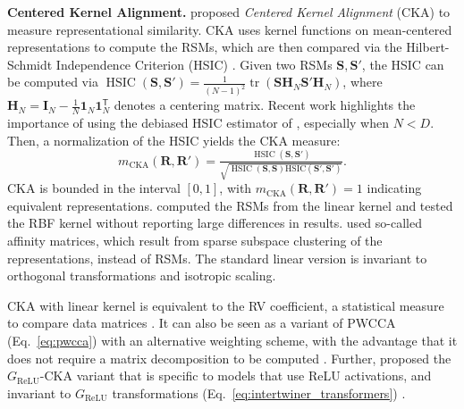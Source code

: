 \documentclass{article}
\newcommand{\citet}{\textcite}
\newcommand{\R}{\bm{R}}
\newcommand{\Rp}{\bm{R'}}
\newcommand{\Sm}{\bm{S}}
\newcommand{\Smp}{\bm{S'}}
\newcommand{\transp}{\mathsf{T}}
\newcommand\myeqref[1]{%
    (\textup{Eq.~\ref{#1}})%
}
\newcommand{\subheader}{\textbf}
\begin{document}
\subheader{Centered Kernel Alignment.}\label{sssec:cka}
\citet{kornblith_similarity_2019} proposed \emph{Centered Kernel Alignment} (CKA) \cite{cortes_algorithms_2012, cristianini_kernel-target_2001} to measure representational similarity.
CKA uses kernel functions on mean-centered representations to compute the RSMs, which are then compared via the Hilbert-Schmidt Independence Criterion (HSIC) \cite{gretton_measuring_2005}.
Given two RSMs $\Sm, \Smp$, the HSIC can be computed via $\operatorname{HSIC}(\Sm, \Smp) = \tfrac{1}{(N-1)^2} \operatorname{tr}(\Sm\bm{H}_N\Smp\bm{H}_N)$, where $\bm{H}_N = \bm{I}_N - \tfrac{1}{N} \bm{1}_N\bm{1}_N^\transp$ denotes a centering matrix. %
Recent work \cite{murphy_correcting_2024} highlights the importance of using the debiased HSIC estimator of \citet{song_feature_2012}, especially when $N<D$.
Then, a normalization of the HSIC yields the CKA measure:
\begin{equation}\label{eq:cka}
    m_{\operatorname{CKA}}(\R,\Rp) = \tfrac{\operatorname{HSIC}(\Sm, \Smp)}{\sqrt{\operatorname{HSIC}(\Sm, \Sm) \mathrm{HSIC}(\Smp, \Smp)}}.
\end{equation}
CKA is bounded in the interval $[0,1]$, with $m_{\operatorname{CKA}}(\R,\Rp)=1$ indicating equivalent representations.
\citet{kornblith_similarity_2019} computed the RSMs from the linear kernel and tested the RBF kernel without reporting large differences in results.
\citet{saini_subspace_2021} used so-called affinity matrices, which result from sparse subspace clustering \cite{elhamifar_sparse_2013} of the representations, instead of RSMs.
The standard linear version is invariant to orthogonal transformations and isotropic scaling.

CKA with linear kernel is equivalent to the RV coefficient, a statistical measure to compare data matrices \cite{robert_unifying_1976, kornblith_similarity_2019}.
It can also be seen as a variant of PWCCA \myeqref{eq:pwcca} with an alternative weighting scheme, with the advantage that it does not require a matrix decomposition to be computed \cite{kornblith_similarity_2019}.
Further, \citet{godfrey_symmetries_2022} proposed the $G_{\operatorname{ReLU}}$-CKA variant that is specific to models that use ReLU activations, and invariant to $G_{\operatorname{ReLU}}$ transformations \myeqref{eq:intertwiner_transformers}.
\end{document}

